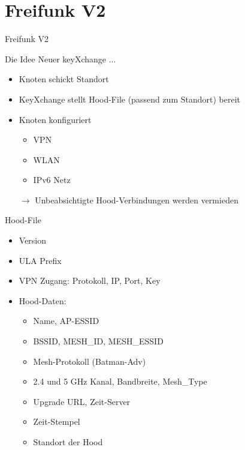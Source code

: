 \section{Freifunk V2}

\begin{frame}{}
    \begin{center}
        Freifunk V2
     \end{center}
\end{frame}

\begin{frame}{Die Idee}
    Neuer keyXchange ...

    \begin{itemize}
        \item Knoten schickt Standort
        \item KeyXchange stellt Hood-File (passend zum Standort) bereit
        \item Knoten konfiguriert
        \begin{itemize}
            \item VPN
            \item WLAN
            \item IPv6 Netz
        \end{itemize}
        \item[$\rightarrow$] Unbeabsichtigte Hood-Verbindungen werden vermieden
    \end{itemize}
\end{frame}

\begin{frame}{Hood-File}
    \begin{itemize}
        \item Version
        \item ULA Prefix
        \item VPN Zugang: Protokoll, IP, Port, Key
        \item Hood-Daten: 
        \begin{itemize}
            \item Name, AP-ESSID
            \item BSSID, MESH\_ID, MESH\_ESSID
            \item Mesh-Protokoll (Batman-Adv)
            \item 2.4 und 5 GHz Kanal, Bandbreite, Mesh\_Type
            \item Upgrade URL, Zeit-Server
            \item Zeit-Stempel
            \item Standort der Hood
        \end{itemize}
    \end{itemize}
\end{frame}


